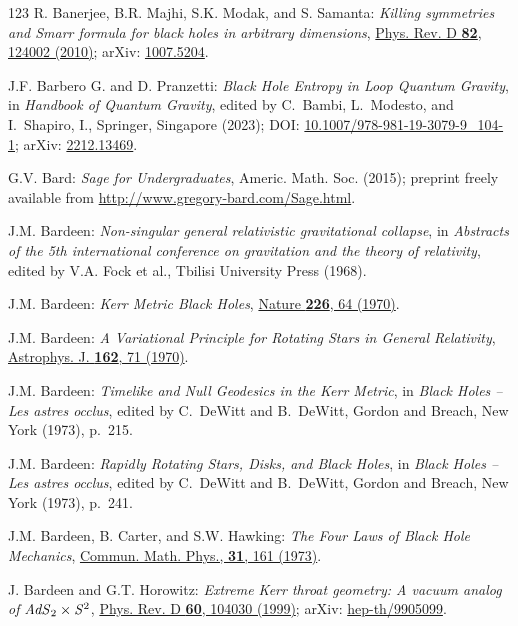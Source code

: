 \begin{thebibliography}{123}
R. Banerjee, B.R. Majhi, S.K. Modak, and S. Samanta:
{\em Killing symmetries and Smarr formula for black holes in arbitrary dimensions},
\href{https://doi.org/10.1103/PhysRevD.82.124002}{Phys. Rev. D {\bf 82}, 124002 (2010)};
arXiv: \href{https://arxiv.org/abs/1007.5204}{1007.5204}.

J.F. Barbero G. and D. Pranzetti:
{\em Black Hole Entropy in Loop Quantum Gravity},
in {\em Handbook of Quantum Gravity}, edited by C.~Bambi, L.~Modesto, and I.~Shapiro, I.,
Springer, Singapore (2023);
DOI: \href{https://doi.org/10.1007/978-981-19-3079-9_104-1}{10.1007/978-981-19-3079-9\_104-1};
arXiv: \href{https://arxiv.org/abs/2212.13469}{2212.13469}.

G.V. Bard: {\em Sage for Undergraduates}, Americ. Math. Soc. (2015);
preprint freely available from \url{http://www.gregory-bard.com/Sage.html}.

J.M. Bardeen:
{\em Non-singular general relativistic gravitational collapse},
in \emph{Abstracts of the 5th international conference on gravitation and the theory of relativity}, edited by V.A. Fock et al., Tbilisi University Press (1968).

J.M. Bardeen:
{\em Kerr Metric Black Holes},
\href{https://doi.org/10.1038/226064a0}{Nature {\bf 226}, 64 (1970)}.

J.M. Bardeen:
{\em A Variational Principle for Rotating Stars in General Relativity},
\href{https://doi.org/10.1086/150635}{Astrophys. J. {\bf  162}, 71 (1970)}.

J.M. Bardeen:
{\em Timelike and Null Geodesics in the Kerr Metric},
in {\em Black Holes -- Les astres occlus},  edited by C.~DeWitt and B.~DeWitt,
Gordon and Breach, New York (1973), p.~215.

J.M. Bardeen:
{\em Rapidly Rotating Stars, Disks, and Black Holes},
in {\em Black Holes -- Les astres occlus},  edited by C.~DeWitt and B.~DeWitt,
Gordon and Breach, New York (1973), p.~241.

J.M. Bardeen, B. Carter, and S.W. Hawking:
{\em The Four Laws of Black Hole Mechanics},
\href{https://doi.org/10.1007/BF01645742}{Commun. Math. Phys., {\bf 31}, 161 (1973)}.

J. Bardeen and G.T. Horowitz:
{\em Extreme Kerr throat geometry: A vacuum analog of ${\it AdS}_2\times{\it S}^2$},
\href{https://doi.org/10.1103/PhysRevD.60.104030}{Phys. Rev. D {\bf 60}, 104030 (1999)};
arXiv: \href{https://arxiv.org/abs/hep-th/9905099}{hep-th/9905099}.


\end{thebibliography}
